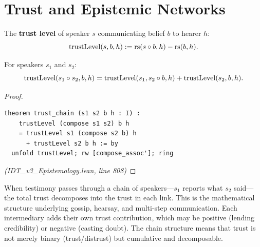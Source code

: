 \section{Trust and Epistemic Networks}

\begin{definition}
\label{def:trust}
The \textbf{trust level} of speaker $s$ communicating belief $b$ to hearer $h$:
\[
  \mathrm{trustLevel}(s, b, h) := \mathrm{rs}(s \circ b, h) - \mathrm{rs}(b, h).
\]
\end{definition}

\begin{theorem}
\label{thm:trust-chain}
For speakers $s_1$ and $s_2$:
\[
  \mathrm{trustLevel}(s_1 \circ s_2, b, h) = \mathrm{trustLevel}(s_1, s_2 \circ b, h) + \mathrm{trustLevel}(s_2, b, h).
\]
\end{theorem}

\begin{proof}
\begin{lstlisting}
theorem trust_chain (s1 s2 b h : I) :
    trustLevel (compose s1 s2) b h
    = trustLevel s1 (compose s2 b) h
      + trustLevel s2 b h := by
  unfold trustLevel; rw [compose_assoc']; ring
\end{lstlisting}
\textit{(IDT\_v3\_Epistemology.lean, line 808)}
\end{proof}

\begin{interpretation}
When testimony passes through a chain of speakers---$s_1$ reports what $s_2$
said---the total trust decomposes into the trust in each link. This is the
mathematical structure underlying gossip, hearsay, and multi-step communication.
Each intermediary adds their own trust contribution, which may be positive
(lending credibility) or negative (casting doubt). The chain structure means
that trust is not merely binary (trust/distrust) but cumulative and
decomposable.
\end{interpretation}

